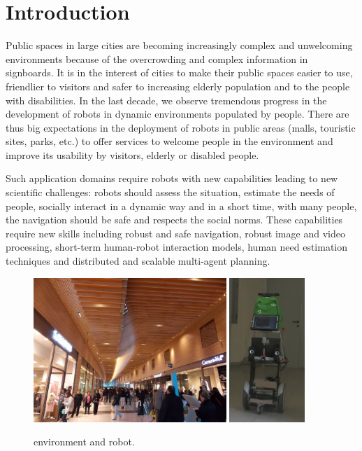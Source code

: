 \section{Introduction}
\label{sec:intro}

Public spaces in large cities are becoming increasingly complex and unwelcoming environments because of the overcrowding and complex information in signboards. It is in the interest of cities to make their public spaces easier to use, friendlier to visitors and safer to increasing elderly population and to the people with disabilities.
%
In the last decade, we observe tremendous progress in the development of robots in dynamic environments populated by people. There are thus big expectations in the deployment of robots in public areas (malls, touristic sites, parks, etc.) to offer services to welcome people in the environment and improve its usability by visitors, elderly or disabled people. 

Such application domains require robots with new capabilities leading to new scientific challenges: robots should assess the situation, estimate the needs of people, socially interact in a dynamic way and in a short time, with many people, the navigation should be safe and respects the social norms. These capabilities require new skills including robust and safe navigation, robust image and video processing, short-term human-robot interaction models, human need estimation techniques and distributed and scalable multi-agent planning.

\begin{figure}[t!]
\centering
\includegraphics[width=0.65\textwidth]{fig/rivedelorne}
\hspace{0.8cm}
\includegraphics[width=0.255\textwidth]{fig/diago1}
\caption{\coaches environment and robot.}
\label{fig:env}
\end{figure}

